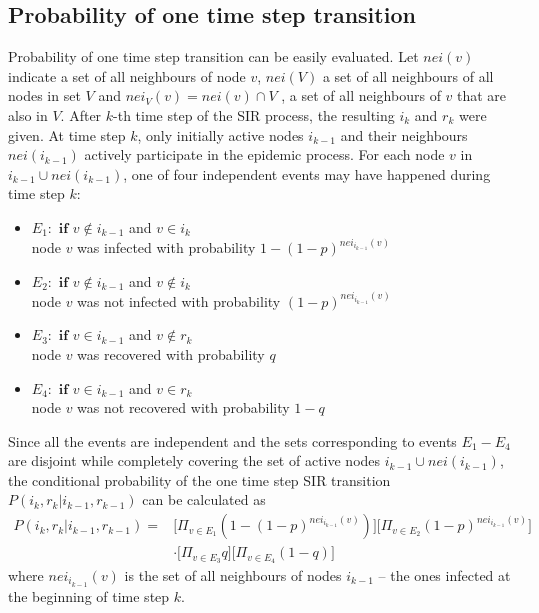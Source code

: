 \documentclass[times, utf8, diplomski]{fer}
\newcommand\tab[1][1cm]{\hspace*{#1}}
\begin{document}
\subsection{Probability of one time step transition}
Probability of one time step transition can be easily evaluated. Let $nei(v)$ indicate a set of all neighbours of node $v$,  $nei(V)$ a set of all neighbours of all nodes in set $V$ and  $nei_V(v) = nei(v) \cap V$ ,  a set of all neighbours of $v$ that are also in $V$. After $k$-th time step of the SIR process, the resulting $i_k$ and $r_k$ were given. At time step $k$, only initially active nodes $i_{k - 1}$ and their neighbours $nei(i_{k - 1})$ actively participate in the epidemic process. For each node $v$ in $i_{k - 1} \cup nei(i_{k - 1})$, one of four independent events may have happened during time step $k$:
\let\labelitemi\labelitemii
\begin{itemize}
\item{$E_1:$ $\mathbf{if}$ $v \not\in i_{k - 1}$ and $v \in i_{k}$\\ \tab node $v$ was infected with probability $1 - (1 - p) ^ {nei_{i_{k-1}}(v)}$}
\item{$E_2:$ $\mathbf{if}$ $v \not\in i_{k - 1}$ and $v \not \in i_{k}$\\ \tab node $v$ was not infected with probability $(1 - p)^{nei_{i_{k-1}}(v)}$}
\item{$E_3:$ $\mathbf{if}$ $v \in i_{k - 1}$ and $v \not\in r_{k}$\\ \tab  node $v$ was recovered with probability $q$}
\item{$E_4:$ $\mathbf{if}$ $v \in i_{k - 1}$ and $v \in r_{k}$ \\ \tab node $v$ was not recovered with probability $1 - q$}
\end{itemize}

Since all the events are independent and the sets corresponding to events $E_{1} - E_{4}$ are disjoint while completely covering the set of active nodes $i_{k - 1} \cup nei(i_{k - 1})$, the  conditional probability of the one time step SIR transition $P(i_k, r_k | i_{k - 1}, r_{k - 1})$ can be calculated as
\begin{equation}
\begin{split}
P(i_k, r_k | i_{k - 1}, r_{k - 1}) =  &\big[\Pi_{v \in E_1} (1 - (1 - p) ^ {nei_{i_{k-1}}(v)})\big]\big[\Pi_{v \in E_2} (1 - p)^{nei_{i_{k-1}}(v)} \big] \\& \cdot
\big[\Pi_{v \in E_3} q\big]\big[ \Pi_{v \in E_4} (1 - q)\big]
\end{split}
\end{equation}
where $nei_{i_{k-1}}(v)$ is the set of all neighbours of nodes $i_{k - 1}$ -- the ones infected at the beginning of time step $k$.
\end{document}
